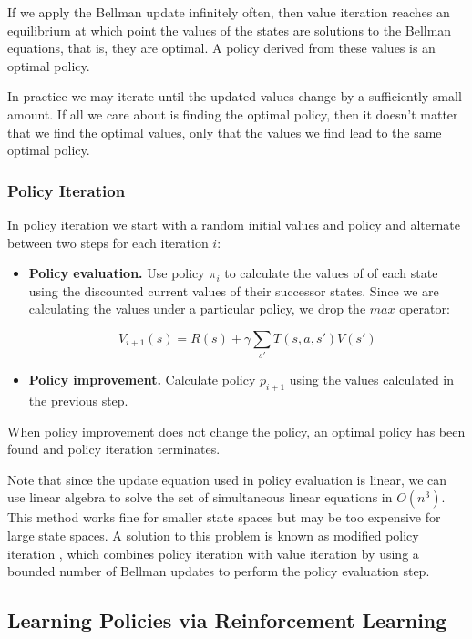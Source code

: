 If we apply the Bellman update infinitely often, then value iteration reaches an equilibrium at which point the values of the states are solutions to the Bellman equations, that is, they are optimal. A policy derived from these values is an optimal policy.

In practice we may iterate until the updated values change by a sufficiently small amount. If all we care about is finding the optimal policy, then it doesn't matter that we find the optimal values, only that the values we find lead to the same optimal policy.

\subsubsection{Policy Iteration}

In policy iteration \cite{howard1960dynamic}we start with a random initial values and policy and alternate between two steps for each iteration $i$:

\begin{itemize}
\item {\bf Policy evaluation.} Use policy $\pi_i$ to calculate the values of of each state using the discounted current values of their successor states. Since we are calculating the values under a particular policy, we drop the $max$ operator:

  \begin{equation}
  V_{i+1}(s) = R(s) + \gamma \sum_{s'} T(s, a, s') V(s')
  \end{equation}

\item {\bf Policy improvement.} Calculate policy $p_{i+1}$ using the values calculated in the previous step.
\end{itemize}

When policy improvement does not change the policy, an optimal policy has been found and policy iteration terminates.

Note that since the update equation used in policy evaluation is linear, we can use linear algebra to solve the set of simultaneous linear equations in $O(n^3)$. This method works fine for smaller state spaces but may be too expensive for large state spaces. A solution to this problem is known as modified policy iteration \cite{van-nunen1976set,puterman1978modified}, which combines policy iteration with value iteration by using a bounded number of Bellman updates to perform the policy evaluation step.

\subsection{Learning Policies via Reinforcement Learning}\label{sec:rl}

